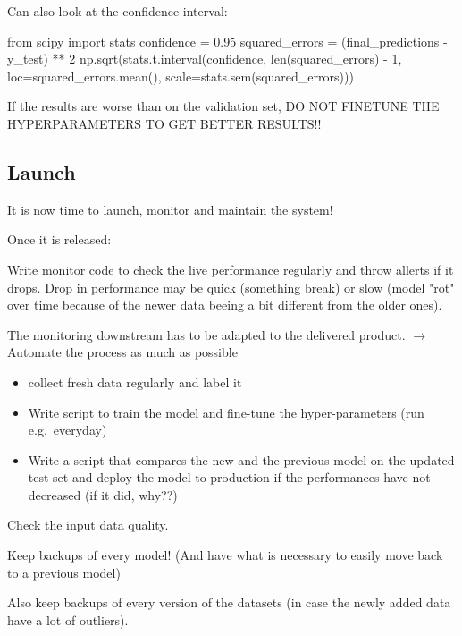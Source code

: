 \documentclass{article}
\begin{document}
        Can also look at the confidence interval:
        \begin{python}
            from scipy import stats
            confidence = 0.95
            squared_errors = (final_predictions - y_test) ** 2
            np.sqrt(stats.t.interval(confidence, len(squared_errors) - 1,
                                     loc=squared_errors.mean(),
                                     scale=stats.sem(squared_errors)))
        \end{python}
        If the results are worse than on the validation set, DO NOT FINETUNE THE HYPERPARAMETERS TO GET BETTER RESULTS!!

    \subsection{Launch}
    It is now time to launch, monitor and maintain the system!

    Once it is released:

    Write monitor code to check the live performance regularly and throw allerts if it drops.
    Drop in performance may be quick (something break) or slow (model "rot" over time because of the newer data beeing a bit different from the older ones).

    The monitoring downstream has to be adapted to the delivered product.
    $\rightarrow$ Automate the process as much as possible
    \begin{itemize}
        \item collect fresh data regularly and label it
        \item Write script to train the model and fine-tune the hyper-parameters (run e.g.\ everyday)
        \item Write a script that compares the new and the previous model on the updated test set and deploy the model to production if the performances have not decreased (if it did, why??)
    \end{itemize}

    Check the input data quality.

    Keep backups of every model!
    (And have what is necessary to easily move back to a previous model)

    Also keep backups of every version of the datasets (in case the newly added data have a lot of outliers).
\end{document}
